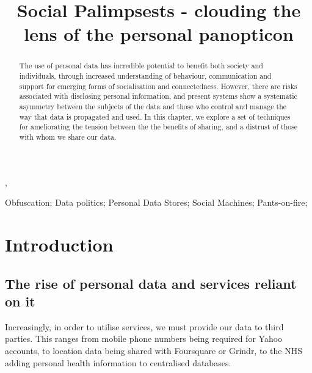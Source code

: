 \documentclass{IOS-Book-Article}     %
\begin{document}
\begin{frontmatter}          %
%
\title{Social Palimpsests - clouding the lens of the personal panopticon}

\author[A]{ },
\author[B]{ }
\author[B]{ }
\address[A]{Centre for Intelligent Systems and Applications,
Department of Informatics, University of Edinburgh}
\address[B]{Southampton}

\begin{abstract}
The use of personal data has incredible potential to benefit both society and
individuals, through increased understanding of behaviour, communication and
support for emerging forms of socialisation and connectedness. However, there
are risks associated with disclosing personal information, and present systems
show a systematic asymmetry between the subjects of the data and those who
control and manage the way that data is propagated and used. In this chapter, we
explore a set of techniques for ameliorating the tension between the 
the benefits of sharing, and a distrust of those with whom we share our data.
\end{abstract}

\begin{keyword}
Obfuscation; Data politics; Personal Data Stores; Social Machines; Pants-on-fire;
\end{keyword}

\end{frontmatter}


\section*{Introduction}

\subsection*{The rise of personal data and services reliant on it}



Increasingly, in order to utilise services, we must provide our data to third
parties. This ranges from mobile phone numbers being required for Yahoo
accounts, to location data being shared with Foursquare or Grindr, to the NHS
adding personal health information to centralised databases. 
\end{document}
